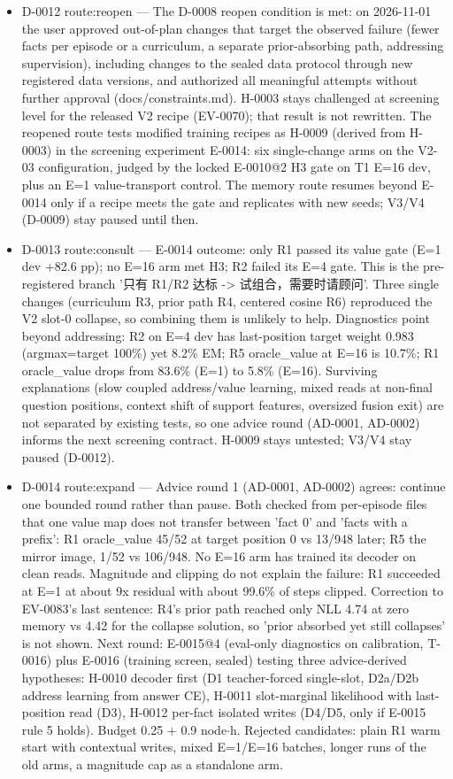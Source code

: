 \documentclass[11pt]{article}
\begin{document}
\begin{itemize}
\item D-0012 route:reopen --- The D-0008 reopen condition is met: on 2026-11-01 the user approved out-of-plan changes that target the observed failure (fewer facts per episode or a curriculum, a separate prior-absorbing path, addressing supervision), including changes to the sealed data protocol through new registered data versions, and authorized all meaningful attempts without further approval (docs/constraints.md). H-0003 stays challenged at screening level for the released V2 recipe (EV-0070); that result is not rewritten. The reopened route tests modified training recipes as H-0009 (derived from H-0003) in the screening experiment E-0014: six single-change arms on the V2-03 configuration, judged by the locked E-0010@2 H3 gate on T1 E=16 dev, plus an E=1 value-transport control. The memory route resumes beyond E-0014 only if a recipe meets the gate and replicates with new seeds; V3/V4 (D-0009) stay paused until then.
\item D-0013 route:consult --- E-0014 outcome: only R1 passed its value gate (E=1 dev +82.6 pp); no E=16 arm met H3; R2 failed its E=4 gate. This is the pre-registered branch '只有 R1/R2 达标 -\textgreater{} 试组合，需要时请顾问'. Three single changes (curriculum R3, prior path R4, centered cosine R6) reproduced the V2 slot-0 collapse, so combining them is unlikely to help. Diagnostics point beyond addressing: R2 on E=4 dev has last-position target weight 0.983 (argmax=target 100\%) yet 8.2\% EM; R5 oracle\_value at E=16 is 10.7\%; R1 oracle\_value drops from 83.6\% (E=1) to 5.8\% (E=16). Surviving explanations (slow coupled address/value learning, mixed reads at non-final question positions, context shift of support features, oversized fusion exit) are not separated by existing tests, so one advice round (AD-0001, AD-0002) informs the next screening contract. H-0009 stays untested; V3/V4 stay paused (D-0012).
\item D-0014 route:expand --- Advice round 1 (AD-0001, AD-0002) agrees: continue one bounded round rather than pause. Both checked from per-episode files that one value map does not transfer between 'fact 0' and 'facts with a prefix': R1 oracle\_value 45/52 at target position 0 vs 13/948 later; R5 the mirror image, 1/52 vs 106/948. No E=16 arm has trained its decoder on clean reads. Magnitude and clipping do not explain the failure: R1 succeeded at E=1 at about 9x residual with about 99.6\% of steps clipped. Correction to EV-0083's last sentence: R4's prior path reached only NLL 4.74 at zero memory vs 4.42 for the collapse solution, so 'prior absorbed yet still collapses' is not shown. Next round: E-0015@4 (eval-only diagnostics on calibration, T-0016) plus E-0016 (training screen, sealed) testing three advice-derived hypotheses: H-0010 decoder first (D1 teacher-forced single-slot, D2a/D2b address learning from answer CE), H-0011 slot-marginal likelihood with last-position read (D3), H-0012 per-fact isolated writes (D4/D5, only if E-0015 rule 5 holds). Budget 0.25 + 0.9 node\ensuremath{\cdot}h. Rejected candidates: plain R1 warm start with contextual writes, mixed E=1/E=16 batches, longer runs of the old arms, a magnitude cap as a standalone arm.

\end{itemize}
\end{document}
